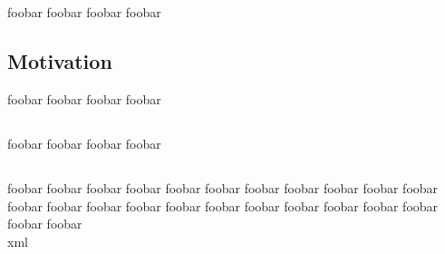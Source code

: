 \chapter{\preamble}
\label{cha:preamble}
foobar foobar foobar foobar
\section{Motivation}
\label{sec:motivation}
foobar foobar foobar foobar
\section{\target}
\label{sec:target}
foobar foobar foobar foobar
\section{\structure}
\label{sec:structure}
foobar foobar foobar foobar foobar foobar foobar foobar
foobar foobar foobar foobar foobar foobar foobar foobar
foobar foobar foobar foobar foobar foobar foobar foobar\\
\gls{xml}
